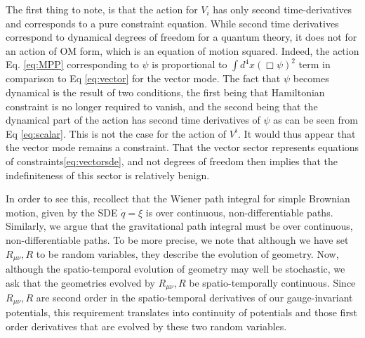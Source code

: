 \documentclass[aps,preprintnumbers,superscriptaddress,longbibliography]{revtex4-1}
\begin{document}
The first thing to note, is that the action for $V_i$ has only second time-derivatives and corresponds to a pure constraint equation. While second time derivatives correspond to dynamical degrees of freedom for a quantum theory, it does not for an action of OM form, which is an equation of motion squared. Indeed, the action Eq. \eqref{eq:MPP} corresponding to $\psi$ is proportional to $\int d^4x(\Box\psi)^2$ term in comparison to  Eq \eqref{eq:vector} for the vector mode. The fact that $\psi$ becomes dynamical is the result of two conditions, the first being that Hamiltonian constraint is no longer required to vanish, and the second being that the dynamical part of the action has second time derivatives of $\psi$ as can be seen from Eq \eqref{eq:scalar}. This is not the case for the action of $V^i$. It would thus appear that the vector mode remains a constraint. That the vector sector represents equations of constraints\eqref{eq:vectorsde}, and not degrees of freedom then implies that the indefiniteness of this sector is relatively benign.

In order to see this, recollect that the Wiener path integral for simple Brownian motion, given by the SDE $\dot{q}=\xi$ is over continuous, non-differentiable paths. Similarly, we argue that the gravitational path integral must be over continuous, non-differentiable paths. To be more precise, we note that although we have set $R_{\mu\nu},R$ to be random variables, they describe the evolution of geometry. Now, although the spatio-temporal evolution of geometry may well be stochastic, we ask that the geometries evolved by $R_{\mu\nu},R$ be spatio-temporally continuous. Since $R_{\mu\nu},R$ are second order in the spatio-temporal derivatives  of our gauge-invariant potentials, this requirement translates into continuity of potentials and those first order derivatives that are evolved by these two random variables.
\end{document}
